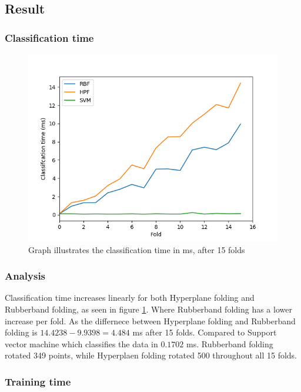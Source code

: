 \documentclass[a4paper,twoside]{bth}
\begin{document}
\subsection{Result}

\FloatBarrier

\subsubsection{Classification time}

\begin{figure}[!htb]
\centering
\includegraphics[scale=0.7]{images/result-hep/hep_k_15/Classifcationtime(ms).png}
   \caption{Graph illustrates the classification time in ms, after 15 folds}
   \label{fig:hep-classify}
\end{figure}
\FloatBarrier
\subsubsection{Analysis}
Classification time increases linearly for both Hyperplane folding and Rubberband folding, as seen in figure \ref{fig:hep-classify}. Where Rubberband folding has a lower increase per fold. As the differnece between Hyperplane folding and Rubberband folding is $14.4238 - 9.9398 = 4.484 $ ms after 15 folds. Compared to Support vector machine which classifies the data in $0.1702$ ms. Rubberband folding rotated 349 points, while Hyperplaen folding rotated 500 throughout all 15 folds.\par

\clearpage
\FloatBarrier

\subsubsection{Training time}
\end{document}
